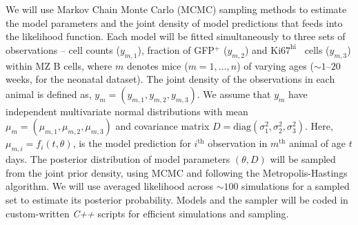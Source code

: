 \documentclass[11pt]{article}
\newcommand{\khi}{\ensuremath{\text{Ki67}^\text{hi}}~}
\begin{document}
We will use  Markov Chain Monte Carlo (MCMC) sampling methods to estimate the model parameters and the joint density of model predictions that feeds into the likelihood function. %
Each model will be fitted simultaneously to three sets of observations -- cell counts ($y_{m,1}$), fraction of {GFP$^+$} ($y_{m,2}$) and {\khi} cells ($y_{m,3}$) within MZ B cells, where $m$ denotes mice ($m = 1,\ldots,n$) of varying ages ($\sim1\text{--}20$ weeks, for the neonatal dataset).
The joint density of the observations in each animal is defined as, $y_{m}=(y_{m,1}, y_{m,2}, y_{m,3})$.
We assume that $y_{m}$ have independent multivariate normal distributions with mean $\mu_{m}=(\mu_{m,1}, \mu_{m,2}, \mu_{m,3})$ and covariance matrix $D = \text{diag}(\sigma_{1}^{2}, \sigma_{2}^{2}, \sigma_{3}^{2})$.
Here, $\mu_{m, i} = f_{i}(t, \theta)$, is the model prediction for  $i^{\text{th}}$ observation in $m^{\text{th}}$ animal of age $t$ days.
The posterior distribution of model parameters $(\theta, D)$ will be sampled from the joint prior density, using MCMC and following the Metropolis-Hastings algorithm. %
We will use averaged likelihood across $\sim100$ simulations for a sampled set to estimate its posterior probability. 
Models and the sampler will be coded in custom-written \textit{C++} scripts for efficient simulations and sampling.
\end{document}
